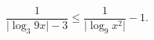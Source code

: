 \begin{ex}[type=inequality]
	\begin{condition}
		$  \dfrac{1}{\big|\log_3 9x\big| -3}\leqslant\dfrac{1}{\big|\log_9 x^2\big|} - 1.$
	\end{condition}
\end{ex}
